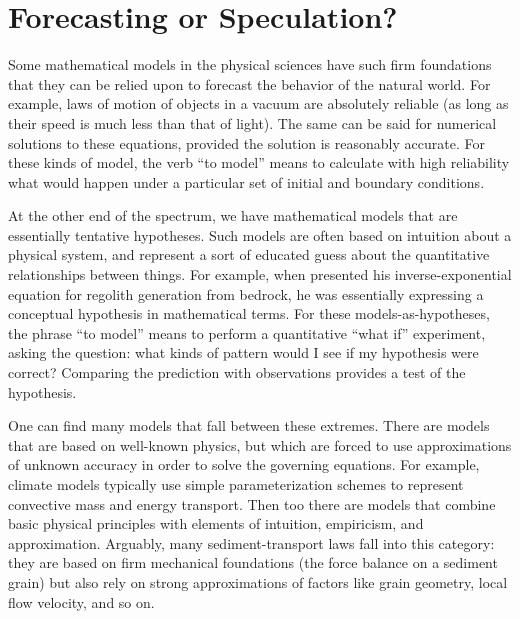 \documentclass[12pt]{amsart}
\begin{document}
\section{Forecasting or Speculation?}

Some mathematical models in the physical sciences have such firm foundations that they can be relied upon to forecast the behavior of the natural world. For example, laws of motion of objects in a vacuum are absolutely reliable (as long as their speed is much less than that of light). The same can be said for numerical solutions to these equations, provided the solution is reasonably accurate. For these kinds of model, the verb ``to model'' means to calculate with high reliability what would happen under a particular set of initial and boundary conditions.

At the other end of the spectrum, we have mathematical models that are essentially tentative hypotheses. Such models are often based on intuition about a physical system, and represent a sort of educated guess about the quantitative relationships between things. For example, when \citet{ahnert1976} presented his inverse-exponential equation for regolith generation from bedrock, he was essentially expressing a conceptual hypothesis in mathematical terms. For these models-as-hypotheses, the phrase ``to model'' means to perform a quantitative ``what if'' experiment, asking the question: what kinds of pattern would I see if my hypothesis were correct? Comparing the prediction with observations provides a test of the hypothesis.

One can find many models that fall between these extremes. There are models that are based on well-known physics, but which are forced to use approximations of unknown accuracy in order to solve the governing equations. For example, climate models typically use simple parameterization schemes to represent convective mass and energy transport. Then too there are models that combine basic physical principles with elements of intuition, empiricism, and approximation. Arguably, many sediment-transport laws fall into this category: they are based on firm mechanical foundations (the force balance on a sediment grain) but also rely on strong approximations of factors like grain geometry, local flow velocity, and so on.
\end{document}
